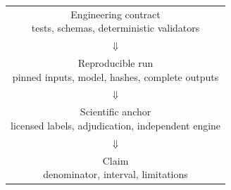 \begin{tabular}{c}
\fbox{\parbox{0.70\linewidth}{\centering Engineering contract\\tests, schemas, deterministic validators}}\\[-1pt]
$\Downarrow$\\[-1pt]
\fbox{\parbox{0.58\linewidth}{\centering Reproducible run\\pinned inputs, model, hashes, complete outputs}}\\[-1pt]
$\Downarrow$\\[-1pt]
\fbox{\parbox{0.46\linewidth}{\centering Scientific anchor\\licensed labels, adjudication, independent engine}}\\[-1pt]
$\Downarrow$\\[-1pt]
\fbox{\parbox{0.34\linewidth}{\centering Claim\\denominator, interval, limitations}}
\end{tabular}
